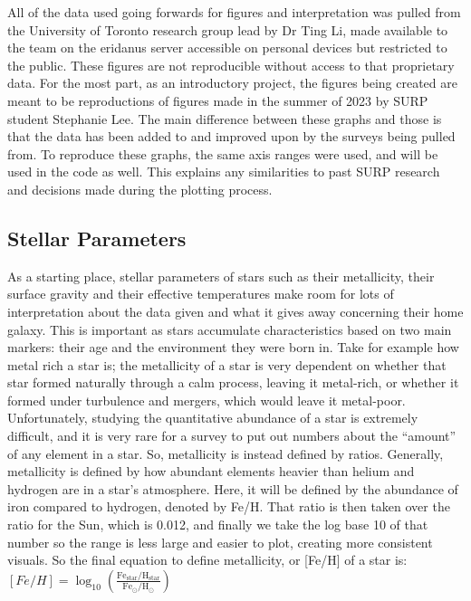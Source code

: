 \documentclass{article}
\begin{document}
\indent All of the data used going forwards for figures and interpretation was pulled from the University of Toronto research group lead by Dr Ting Li, made available to the team on the eridanus server accessible on personal devices but restricted to the public. These figures are not reproducible without access to that proprietary data. For the most part, as an introductory project, the figures being created are meant to be reproductions of figures made in the summer of 2023 by SURP student Stephanie Lee. The main difference between these graphs and those is that the data has been added to and improved upon by the surveys being pulled from. To reproduce these graphs, the same axis ranges were used, and will be used in the code as well. This explains any similarities to past SURP research and decisions made during the plotting process.\\

\subsection*{Stellar Parameters}
\indent As a starting place, stellar parameters of stars such as their metallicity, their surface gravity and their effective temperatures make room for lots of interpretation about the data given and what it gives away concerning their home galaxy. This is important as stars accumulate characteristics based on two main markers: their age and the environment they were born in. Take for example how metal rich a star is; the metallicity of a star is very dependent on whether that star formed naturally through a calm process, leaving it metal-rich, or whether it formed under turbulence and mergers, which would leave it metal-poor. Unfortunately, studying the quantitative abundance of a star is extremely difficult, and it is very rare for a survey to put out numbers about the “amount” of any element in a star. So, metallicity is instead defined by ratios. Generally, metallicity is defined by how abundant elements heavier than helium and hydrogen are in a star's atmosphere. Here, it will be defined by the abundance of iron compared to hydrogen, denoted by Fe/H. That ratio is then taken over the ratio for the Sun, which is 0.012, and finally we take the log base 10 of that number so the range is less large and easier to plot, creating more consistent visuals. So the final equation to define metallicity, or [Fe/H] of a star is:\\

$[Fe/H] = \log_{10} \left( \frac{{\text{Fe}_{\text{star}} / \text{H}_{\text{star}}}}{{\text{Fe}_{\odot} / \text{H}_{\odot}}} \right)
$\\
\end{document}
